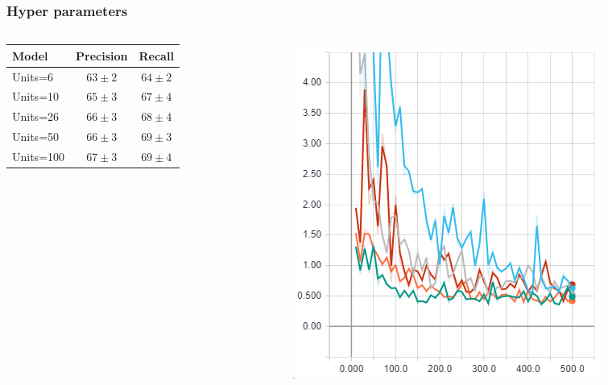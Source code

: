 \documentclass{beamer}
\begin{document}
\begin{frame}
\frametitle{Hyper parameters}
\begin{columns}
	\begin{column}{0.5\textwidth}
		\begin{tabular}{l|c|c} 
			Model & Precision & Recall \\ \hline 
			Units=6 & $63 \pm 2$ & $64 \pm 2$ \\ 
			Units=10 & $65 \pm 3$ & $67 \pm 4$ \\ 
			Units=26 & $66 \pm 3$ & $68 \pm 4$ \\ 
			Units=50 & $66 \pm 3$ & $69 \pm 3$ \\ 
			Units=100 & $67 \pm 3$ & $69 \pm 4$ \\
		\end{tabular}
	\end{column}
	\begin{column}{0.5\textwidth}
		\begin{center}
			\includegraphics[width=\textwidth]{diff_units.png}
		\end{center}
	\end{column}
\end{columns}
\end{frame}
\end{document}
